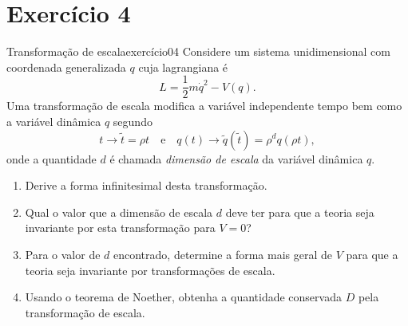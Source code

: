 \section*{Exercício 4}
\begin{exercício}{Transformação de escala}{exercício04}
    Considere um sistema unidimensional com coordenada generalizada \(q\) cuja lagrangiana é
    \begin{equation*}
        L = \frac12 m \dot{q}^2 - V(q).
    \end{equation*}
    Uma transformação de escala modifica a variável independente tempo bem como a variável dinâmica \(q\) segundo
    \begin{equation*}
        t \to \tilde{t} = \rho t\quad\text{e}\quad q(t) \to \tilde{q}(\tilde{t}) = \rho^d q(\rho t),
    \end{equation*}
    onde a quantidade \(d\) é chamada \emph{dimensão de escala} da variável dinâmica \(q\).
    \begin{enumerate}[label=(\alph*)]
        \item Derive a forma infinitesimal desta transformação.
        \item Qual o valor que a dimensão de escala \(d\) deve ter para que a teoria seja invariante por esta transformação para \(V = 0\)?
        \item Para o valor de \(d\) encontrado, determine a forma mais geral de \(V\) para que a teoria seja invariante por transformações de escala.
        \item Usando o teorema de Noether, obtenha a quantidade conservada \(D\) pela transformação de escala.
    \end{enumerate}
\end{exercício}
